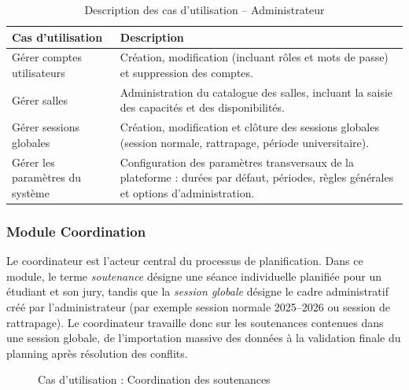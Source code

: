 \documentclass[12pt,a4paper]{article}
\begin{document}
\begin{table}[H]
    \centering
    \small
    \begin{tabular}{lp{10cm}}
        \toprule
        \rowcolor{primary!10}
        \textbf{Cas d'utilisation}       & \textbf{Description}                                                                            \\
        \midrule
        Gérer comptes utilisateurs       & Création, modification (incluant rôles et mots de passe) et suppression des comptes.            \\
        \addlinespace
        Gérer salles                     & Administration du catalogue des salles, incluant la saisie des capacités et des disponibilités. \\
        \addlinespace
        Gérer sessions globales            & Création, modification et clôture des sessions globales (session normale, rattrapage, période universitaire). \\
        \addlinespace
        Gérer les paramètres du système    & Configuration des paramètres transversaux de la plateforme : durées par défaut, périodes, règles générales et options d'administration. \\
        \bottomrule
    \end{tabular}
    \caption{Description des cas d'utilisation -- Administrateur}
\end{table}

\subsubsection{Module Coordination}

Le coordinateur est l'acteur central du processus de planification. Dans ce module, le terme \textit{soutenance} désigne une séance individuelle planifiée pour un étudiant et son jury, tandis que la \textit{session globale} désigne le cadre administratif créé par l'administrateur (par exemple session normale 2025--2026 ou session de rattrapage). Le coordinateur travaille donc sur les soutenances contenues dans une session globale, de l'importation massive des données à la validation finale du planning après résolution des conflits.

\begin{figure}[H]
    \centering
    \caption{Cas d'utilisation : Coordination des soutenances}
\end{figure}
\end{document}
